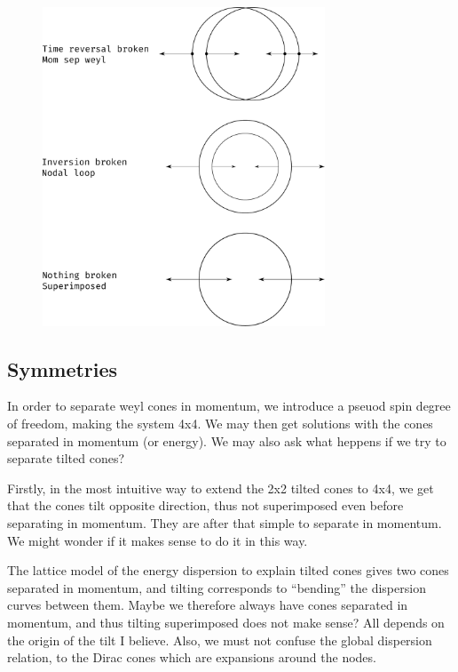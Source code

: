 \begin{figure}[ht]
  \centering
  \includegraphics[width=0.75\textwidth]{figures/spinStructureWeyl}
  \caption{\label{fig:spinStructure} }
\end{figure}



\subsection{Symmetries}
In order to separate weyl cones in momentum, we introduce a pseuod spin degree of freedom, making the system 4x4.
We may then get solutions with the cones separated in momentum (or energy).
We may also ask what heppens if we try to separate tilted cones?

Firstly, in the most intuitive way to extend the 2x2 tilted cones to 4x4, we get that the cones tilt opposite direction, thus not superimposed even before separating in momentum.
They are after that simple to separate in momentum.
We might wonder if it makes sense to do it in this way.

The lattice model of the energy dispersion to explain tilted cones gives two cones separated in momentum, and tilting corresponds to ``bending'' the dispersion curves between them.
Maybe we therefore always have cones separated in momentum, and thus tilting superimposed does not make sense?
All depends on the origin of the tilt I believe.
Also, we must not confuse the global dispersion relation, to the Dirac cones which are expansions around the nodes.

